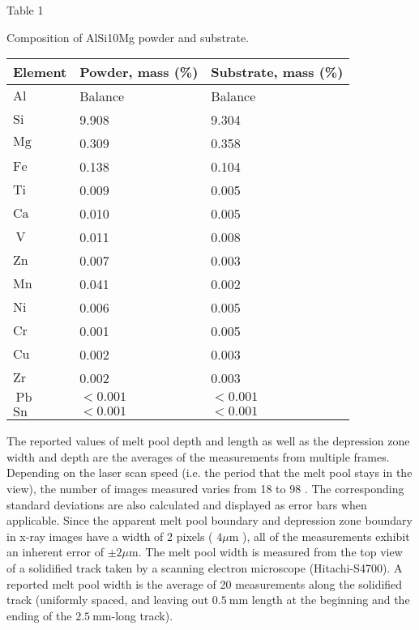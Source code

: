 \documentclass[10pt]{article}
\begin{document}
Table 1

Composition of AlSi10Mg powder and substrate.

\begin{center}
\begin{tabular}{lll}
\hline
Element & Powder, mass (\%) & Substrate, mass (\%) \\
\hline
$\mathrm{Al}$ & Balance & Balance \\
$\mathrm{Si}$ & 9.908 & 9.304 \\
$\mathrm{Mg}$ & 0.309 & 0.358 \\
$\mathrm{Fe}$ & 0.138 & 0.104 \\
$\mathrm{Ti}$ & 0.009 & 0.005 \\
$\mathrm{Ca}$ & 0.010 & 0.005 \\
$\mathrm{~V}$ & 0.011 & 0.008 \\
$\mathrm{Zn}$ & 0.007 & 0.003 \\
$\mathrm{Mn}$ & 0.041 & 0.002 \\
$\mathrm{Ni}$ & 0.006 & 0.005 \\
$\mathrm{Cr}$ & 0.001 & 0.005 \\
$\mathrm{Cu}$ & 0.002 & 0.003 \\
$\mathrm{Zr}$ & 0.002 & 0.003 \\
$\mathrm{~Pb}$ & $<0.001$ & $<0.001$ \\
$\mathrm{Sn}$ & $<0.001$ & $<0.001$ \\
\hline
\end{tabular}
\end{center}

The reported values of melt pool depth and length as well as the depression zone width and depth are the averages of the measurements from multiple frames. Depending on the laser scan speed (i.e. the period that the melt pool stays in the view), the number of images measured varies from 18 to 98 . The corresponding standard deviations are also calculated and displayed as error bars when applicable. Since the apparent melt pool boundary and depression zone boundary in x-ray images have a width of 2 pixels ( $4 \mu \mathrm{m}$ ), all of the measurements exhibit an inherent error of $\pm 2 \mu \mathrm{m}$. The melt pool width is measured from the top view of a solidified track taken by a scanning electron microscope (Hitachi-S4700). A reported melt pool width is the average of 20 measurements along the solidified track (uniformly spaced, and leaving out $0.5 \mathrm{~mm}$ length at the beginning and the ending of the $2.5 \mathrm{~mm}$-long track).
\end{document}
